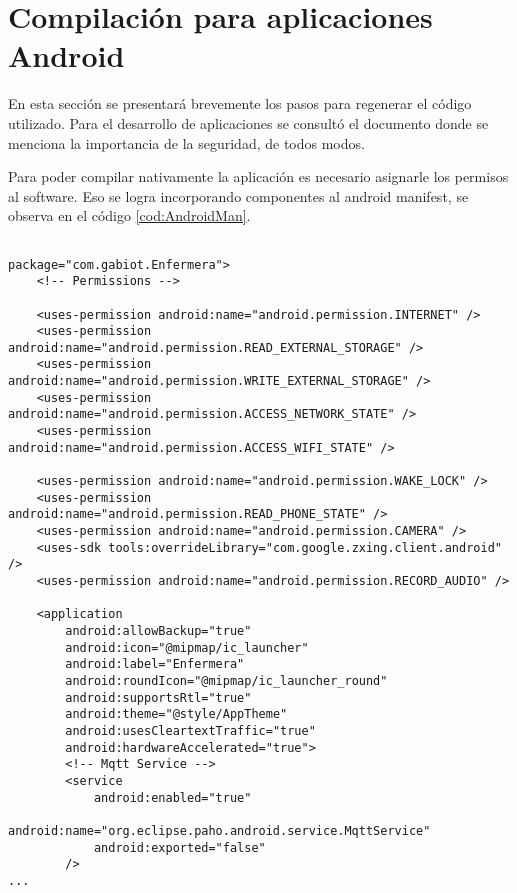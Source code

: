 
\chapter{Compilación para aplicaciones Android} %

\label{Compilación para aplicaciones Android} %

En esta sección se presentará brevemente los pasos para regenerar el código utilizado. Para el desarrollo de aplicaciones se consultó el documento \citep{BOOK:3} donde se menciona la importancia de la seguridad, de todos modos.

Para poder compilar nativamente la aplicación es necesario asignarle los permisos al software. Eso se logra incorporando componentes al android manifest, se observa en el código \ref{cod:AndroidMan}.

\begin{lstlisting}[label=cod:AndroidMan,caption=Modificaciones al Android Manifest.]  % Start your code-block

package="com.gabiot.Enfermera">
    <!-- Permissions -->

    <uses-permission android:name="android.permission.INTERNET" />
    <uses-permission android:name="android.permission.READ_EXTERNAL_STORAGE" />
    <uses-permission android:name="android.permission.WRITE_EXTERNAL_STORAGE" />
    <uses-permission android:name="android.permission.ACCESS_NETWORK_STATE" />
    <uses-permission android:name="android.permission.ACCESS_WIFI_STATE" />

    <uses-permission android:name="android.permission.WAKE_LOCK" />
    <uses-permission android:name="android.permission.READ_PHONE_STATE" />
    <uses-permission android:name="android.permission.CAMERA" />
    <uses-sdk tools:overrideLibrary="com.google.zxing.client.android" />
    <uses-permission android:name="android.permission.RECORD_AUDIO" />

    <application
        android:allowBackup="true"
        android:icon="@mipmap/ic_launcher"
        android:label="Enfermera"
        android:roundIcon="@mipmap/ic_launcher_round"
        android:supportsRtl="true"
        android:theme="@style/AppTheme"
        android:usesCleartextTraffic="true"
        android:hardwareAccelerated="true">
        <!-- Mqtt Service -->
        <service
            android:enabled="true"
            android:name="org.eclipse.paho.android.service.MqttService"
            android:exported="false"
        />
...

\end{lstlisting}